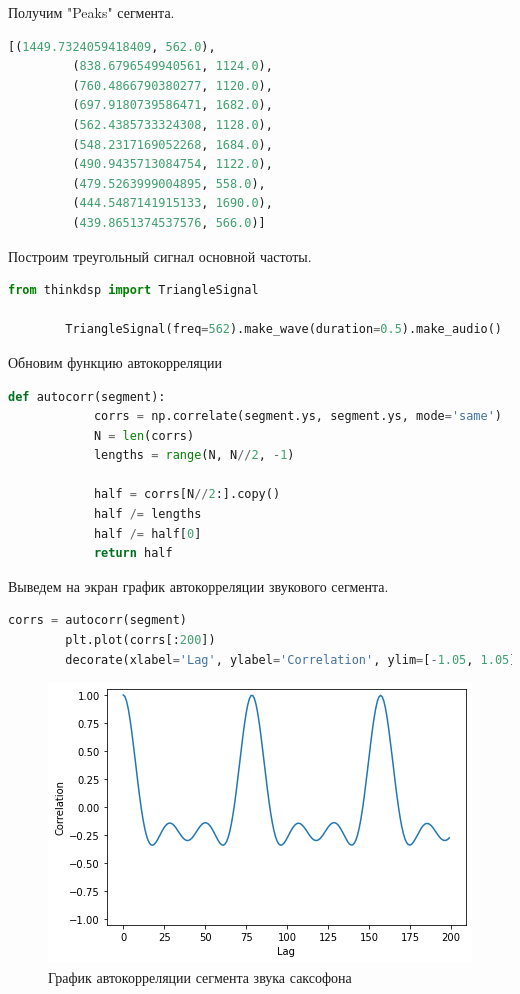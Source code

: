 \documentclass[a4paper, 14pt]{extarticle}
\begin{document}
    Получим "Peaks" сегмента.

    \begin{lstlisting}[language=Python, caption= Peaks, label={lst:peaks}]
        [(1449.7324059418409, 562.0),
         (838.6796549940561, 1124.0),
         (760.4866790380277, 1120.0),
         (697.9180739586471, 1682.0),
         (562.4385733324308, 1128.0),
         (548.2317169052268, 1684.0),
         (490.9435713084754, 1122.0),
         (479.5263999004895, 558.0),
         (444.5487141915133, 1690.0),
         (439.8651374537576, 566.0)]
    \end{lstlisting}

    Построим треугольный сигнал основной частоты.

    \begin{lstlisting}[language=Python, caption= Создание треугольного сигнала, label={lst:create_triangle_signal}]
        from thinkdsp import TriangleSignal

        TriangleSignal(freq=562).make_wave(duration=0.5).make_audio()
    \end{lstlisting}

    Обновим функцию автокорреляции

    \begin{lstlisting}[language=Python, caption= Обновление функции autocorr, label={lst:update_autocorr}]
        def autocorr(segment):
            corrs = np.correlate(segment.ys, segment.ys, mode='same')
            N = len(corrs)
            lengths = range(N, N//2, -1)

            half = corrs[N//2:].copy()
            half /= lengths
            half /= half[0]
            return half
    \end{lstlisting}

    Выведем на экран график автокорреляции звукового сегмента.

    \begin{lstlisting}[language=Python, caption= Вывод графика автокорреляции, label={lst:sax_autocorr}]
        corrs = autocorr(segment)
        plt.plot(corrs[:200])
        decorate(xlabel='Lag', ylabel='Correlation', ylim=[-1.05, 1.05])
    \end{lstlisting}

    \begin{figure}[H]
        \centering
        \includegraphics[width=0.8\linewidth]{sax_autocorr}
        \caption{График автокорреляции сегмента звука саксофона}
        \label{fig:sax_autocorr}
    \end{figure}
\end{document}
